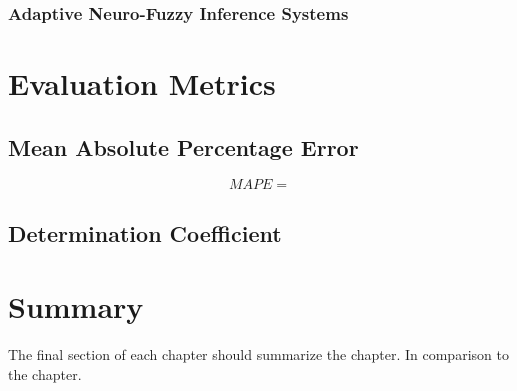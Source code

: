 \subsubsection{Adaptive Neuro-Fuzzy Inference Systems}




\section{Evaluation Metrics}
\label{sec:section_Example}

\subsection{Mean Absolute Percentage Error}

\begin{equation}
    MAPE = 
\end{equation}

\subsection{Determination Coefficient}

\section{Summary}
\label{s:Background-Summary}

The final section of each chapter should summarize the chapter. In comparison to the chapter.

